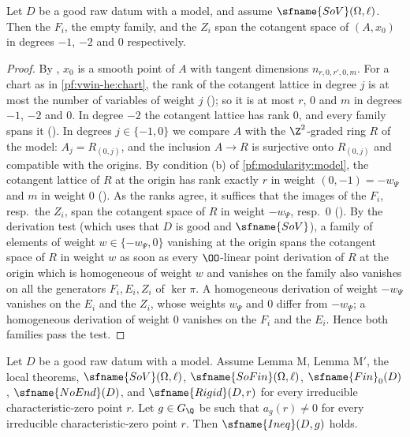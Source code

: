 \begin{lemma}\label{pf:modularity:m1b}
Let $D$ be a good raw datum with a model, and assume $\sfname{SoV}(\Omega,\ell)$. Then the $F_i$, the empty family, and
the $Z_i$ span the cotangent space of $(A,x_0)$ in degrees $-1$, $-2$ and $0$ respectively.
\end{lemma}

\begin{proof}
By , $x_0$ is a smooth point of $A$ with tangent
dimensions $n_{r,0,r',0,m}$. For a chart as in \cref{pf:vwin-he:chart}, the rank of the cotangent lattice in degree $j$ is
at most the number of variables of weight $j$ (); so it is at most $r$, $0$ and
$m$ in degrees $-1$, $-2$ and $0$. In degree $-2$ the cotangent lattice has rank $0$, and every family spans it
(). In degrees $j\in\{-1,0\}$ we compare $A$ with the $\Z^2$-graded ring $R$ of the
model: $A_j=R_{(0,j)}$, and the inclusion $A\to R$ is surjective onto $R_{(0,j)}$ and compatible with the origins. By
condition (b) of \cref{pf:modularity:model}, the cotangent lattice of $R$ at the origin has rank exactly $r$ in weight
$(0,-1)=-w_\Psi$ and $m$ in weight $0$ (). As the ranks agree, it suffices that
the images of the $F_i$, resp.\ the $Z_i$, span the cotangent space of $R$ in weight $-w_\Psi$, resp.\ $0$
(). By the derivation test 
(which uses that $D$ is good and $\sfname{SoV}$), a family of elements of weight $w\in\{-w_\Psi,0\}$ vanishing at the origin
spans the cotangent space of $R$ in weight $w$ as soon as every $\OO$-linear point derivation of $R$ at the origin which is
homogeneous of weight $w$ and vanishes on the family also vanishes on all the generators $F_i,E_i,Z_i$ of $\ker\pi$. A
homogeneous derivation of weight $-w_\Psi$ vanishes on the $E_i$ and the $Z_i$, whose weights $w_\Psi$ and $0$ differ from
$-w_\Psi$; a homogeneous derivation of weight $0$ vanishes on the $F_i$ and the $E_i$. Hence both families pass the test.
\end{proof}

\begin{proposition}\label{pf:modularity:ineq}
Let $D$ be a good raw datum with a model. Assume Lemma M, Lemma M$'$, the local theorems, $\sfname{SoV}(\Omega,\ell)$,
$\sfname{SoFin}(\Omega,\ell)$, $\sfname{Fin}_0(D)$, $\sfname{NoEnd}(D)$, and $\sfname{Rigid}(D,r)$ for every irreducible
characteristic-zero point $r$. Let $g\in G_\Q$ be such that $a_g(r)\ne0$ for every irreducible characteristic-zero point
$r$. Then $\sfname{Ineq}(D,g)$ holds.
\end{proposition}

